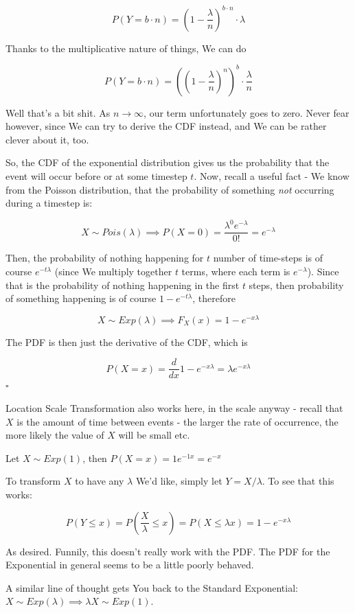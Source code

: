 \documentclass{article}
\newcommand{\qed}{\hfill$\square$}
\begin{document}
		 \[ P(Y = b\cdot n) = \left( 1-\frac{\lambda}{n}\right)^{b\cdot n}\cdot \lambda \]
		
		Thanks to the multiplicative nature of things, We can do
		
		 \[ P(Y = b\cdot n) = \left(\left( 1-\frac{\lambda}{n}\right)^n\right)^b\cdot \frac{\lambda}{n} \]
		
		Well that's a bit shit. As $n\to\infty$, our term unfortunately goes to zero. Never fear however, since We can try to derive the CDF instead, and We can be rather clever about it, too.
		
		So, the CDF of the exponential distribution gives us the probability that the event will occur before or at some timestep $t$. Now, recall a useful fact - We know from the Poisson distribution, that the probability of something \textit{not} occurring during a timestep is:
		
		\[X\sim Pois(\lambda)\implies P(X=0) = \frac{\lambda^0e^{-\lambda}}{0!} = e^{-\lambda}\]
		
		Then, the probability of nothing happening for $t$ number of time-steps is of course $
e^{-t\lambda}$ (since We multiply together $t$ terms, where each term is $e^{-\lambda}$). Since that is the probability of nothing happening in the first $t$ steps, then probability of something happening is of course $1-e^{-t\lambda}$, therefore

		\[ X\sim Exp(\lambda)\implies F_X(x) = 1 - e^{-x\lambda} \]
		
		The PDF is then just the derivative of the CDF, which is 
		
		\[ P(X = x) = \frac{d}{dx} 1 - e^{-x\lambda} = \lambda e^{-x\lambda} \]\qed
		
		Location Scale Transformation also works here, in the scale anyway - recall that $X$ is the amount of time between events - the larger the rate of occurrence, the more likely the value of $X$ will be small etc.
		
		Let $X\sim Exp(1)$, then $P(X=x) = 1e^{-1x}= e^{-x}$
		
		To transform $X$ to have any $\lambda$ We'd like, simply let $Y=X/\lambda$. To see that this works:
		
		\[P(Y \le x) = P\left(\frac{X}{\lambda} \le x \right) = P(X \le \lambda x) = 1-e^{-x\lambda}  \]
		
		As desired. Funnily, this doesn't really work with the PDF. The PDF for the Exponential in general seems to be a little poorly behaved. 
		
		A similar line of thought gets You back to the Standard Exponential: $X\sim Exp(\lambda) \implies \lambda X\sim Exp(1)$.
		
\end{document}
